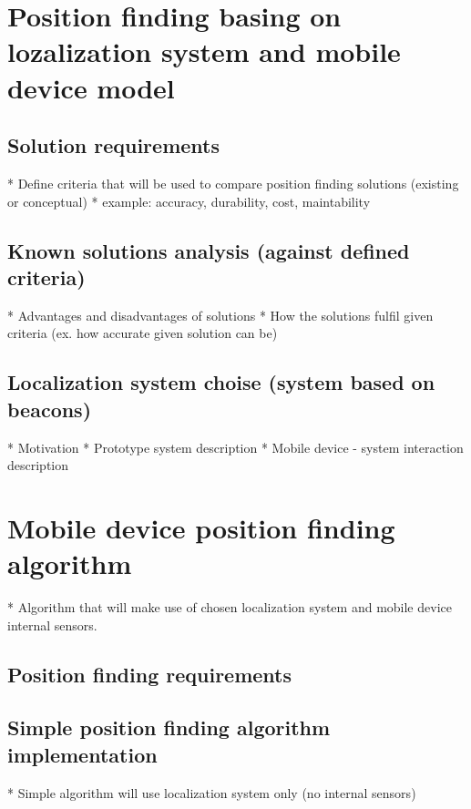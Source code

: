 \documentclass[../main.tex]{subfiles}
\begin{document}
\chapter{Position finding basing on lozalization system and mobile device model}

\section{Solution requirements}
* Define criteria that will be used to compare position finding solutions (existing or conceptual)
* example: accuracy, durability, cost, maintability


\section{Known solutions analysis (against defined criteria)}
* Advantages and disadvantages of solutions
* How the solutions fulfil given criteria (ex. how accurate given solution can be)

\section{Localization system choise (system based on beacons)}
* Motivation
* Prototype system description
* Mobile device - system interaction description




\chapter{Mobile device position finding algorithm}
* Algorithm that will make use of chosen localization system and mobile device internal sensors.

\section{Position finding requirements} %
\label{sec:position_finding_requirements}


\section{Simple position finding algorithm implementation} %
\label{sec:simple_position_finding_algorithm_implementation}

* Simple algorithm will use localization system only (no internal sensors)
\end{document}
